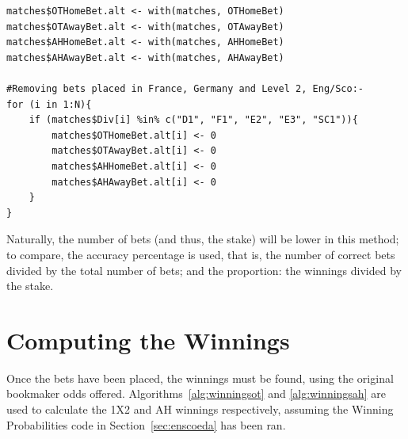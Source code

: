 \documentclass[a4paper,10pt]{report}
\begin{document}
\begin{lstlisting}
matches$OTHomeBet.alt <- with(matches, OTHomeBet)
matches$OTAwayBet.alt <- with(matches, OTAwayBet)
matches$AHHomeBet.alt <- with(matches, AHHomeBet)
matches$AHAwayBet.alt <- with(matches, AHAwayBet)

#Removing bets placed in France, Germany and Level 2, Eng/Sco:-
for (i in 1:N){
	if (matches$Div[i] %in% c("D1", "F1", "E2", "E3", "SC1")){
		matches$OTHomeBet.alt[i] <- 0
		matches$OTAwayBet.alt[i] <- 0
		matches$AHHomeBet.alt[i] <- 0
		matches$AHAwayBet.alt[i] <- 0
	}
}
\end{lstlisting}

Naturally, the number of bets (and thus, the stake) will be lower in this method; to compare, the accuracy percentage is used, that is, the number of correct bets divided by the total number of bets; and the proportion: the winnings divided by the stake. 

\section{Computing the Winnings} \label{sec:winnings}

Once the bets have been placed, the winnings must be found, using the original bookmaker odds offered. Algorithms~\ref{alg:winningsot} and \ref{alg:winningsah} are used to calculate the 1X2 and AH winnings respectively, assuming the Winning Probabilities code in Section~\ref{sec:enscoeda} has been ran. \vspace{3mm}
\end{document}
